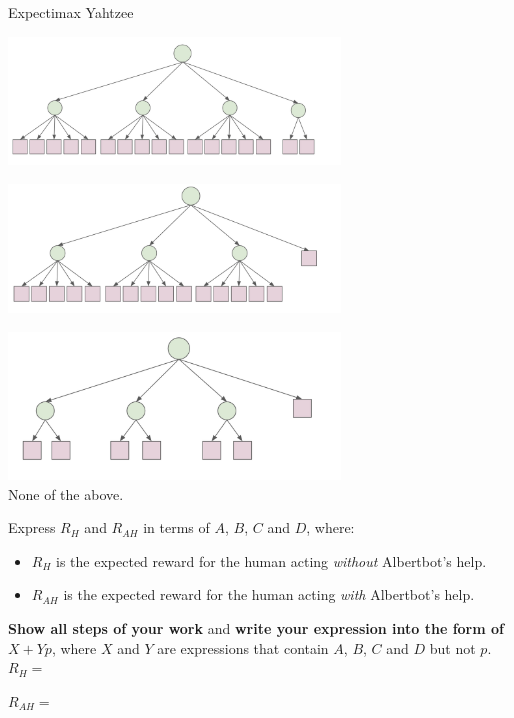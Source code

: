 \begin{problem}{Expectimax Yahtzee}
\begin{question}
\begin{subquestion}[3]
\mcqb \includegraphics[width=250pt]{figures/q1_bot_b.png} 

\mcqb \includegraphics[width=250pt]{figures/q1_bot_c.png}

\mcqb \includegraphics[width=250pt]{figures/q1_bot_d.png}
\\
\mcqb None of the above.
\\


\end{subquestion}




\newpage
\begin{subquestion}[5]
Express $R_H$ and $R_{AH}$ in terms of $A$, $B$, $C$ and $D$, where:
\begin{itemize}
    \item $R_H$ is the expected reward for the human acting {\em without} Albertbot's help.
    \item $R_{AH}$ is the expected reward for the human acting {\em with} Albertbot's help.
\end{itemize}
\textbf{Show all steps of your work} and \textbf{write your expression into the form of $X + Y p$}, where $X$ and $Y$ are expressions that contain $A$, $B$, $C$ and $D$ but not $p$. \\

$R_H =$

$R_{AH} =$

\end{subquestion}


\end{question}
\end{problem}
